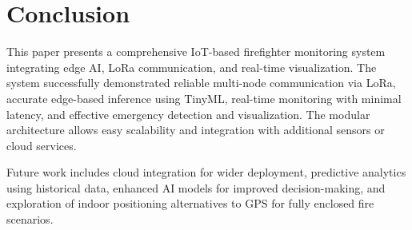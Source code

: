 \documentclass[conference]{IEEEtran}
\begin{document}
	\section{Conclusion}
	
	This paper presents a comprehensive IoT-based firefighter monitoring system
	integrating edge AI, LoRa communication, and real-time visualization. The system
	successfully demonstrated reliable multi-node communication via LoRa, accurate
	edge-based inference using TinyML, real-time monitoring with minimal latency,
	and effective emergency detection and visualization. The modular architecture
	allows easy scalability and integration with additional sensors or cloud
	services.
	
	Future work includes cloud integration for wider deployment, predictive analytics
	using historical data, enhanced AI models for improved decision-making, and
	exploration of indoor positioning alternatives to GPS for fully enclosed fire
	scenarios.
	
\end{document}
